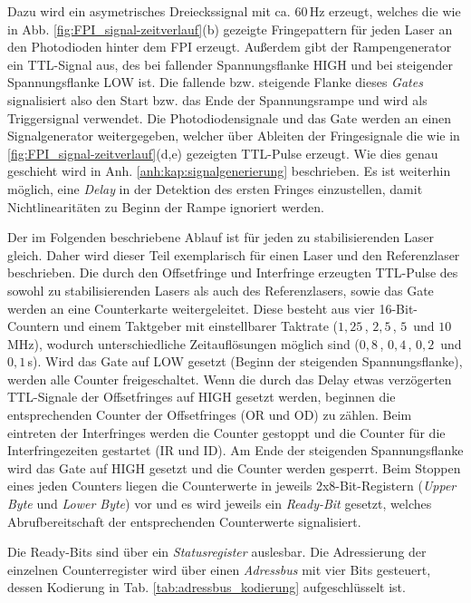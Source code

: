 Dazu wird ein asymetrisches Dreieckssignal mit ca. $60\,$Hz erzeugt, welches die wie in Abb.
\ref{fig:FPI_signal-zeitverlauf}(b) gezeigte Fringepattern für jeden Laser
an den Photodioden hinter dem FPI erzeugt. Außerdem gibt der Rampengenerator
ein TTL-Signal aus, des bei fallender Spannungsflanke HIGH und bei
steigender Spannungsflanke LOW ist. Die fallende bzw. steigende Flanke dieses
\textit{Gates} signalisiert also den Start bzw. das Ende der Spannungsrampe
und wird als Triggersignal verwendet. Die Photodiodensignale und das
Gate werden an einen Signalgenerator weitergegeben, welcher über Ableiten der
Fringesignale die wie in \ref{fig:FPI_signal-zeitverlauf}(d,e) gezeigten TTL-Pulse erzeugt.
Wie dies genau geschieht wird in Anh. \ref{anh:kap:signalgenerierung}
beschrieben. Es ist weiterhin möglich, eine \textit{Delay} in der Detektion des
ersten Fringes einzustellen, damit Nichtlinearitäten zu Beginn der Rampe
ignoriert werden.\par
Der im Folgenden beschriebene Ablauf ist für jeden zu stabilisierenden Laser
gleich. Daher wird dieser Teil exemplarisch für einen Laser und den
Referenzlaser beschrieben. Die durch den Offsetfringe und Interfringe erzeugten
TTL-Pulse des sowohl zu stabilisierenden Lasers als auch des Referenzlasers,
sowie das Gate werden an eine Counterkarte weitergeleitet. Diese besteht aus
vier 16-Bit-Countern und einem Taktgeber mit einstellbarer Taktrate ($1,25\,$,
$2,5\,$, $5\,$ und $10\,$MHz), wodurch unterschiedliche Zeitauflösungen möglich
sind ($0,8\,$, $0,4\,$, $0,2\,$ und $0,1\,$\textmu s).
Wird das Gate auf LOW gesetzt (Beginn der steigenden Spannungsflanke), werden
alle Counter freigeschaltet. Wenn die durch
das Delay etwas verzögerten TTL-Signale der Offsetfringes auf HIGH gesetzt werden, beginnen die
entsprechenden Counter der Offsetfringes (OR und OD) zu zählen. Beim eintreten
der Interfringes werden die Counter gestoppt und die Counter für die
Interfringezeiten gestartet (IR und ID). Am Ende der steigenden Spannungsflanke
wird das Gate auf HIGH gesetzt und die Counter werden gesperrt. Beim Stoppen eines
jeden Counters liegen die Counterwerte in jeweils 2x8-Bit-Registern
(\textit{Upper Byte} und \textit{Lower Byte}) vor und es wird jeweils ein
\textit{Ready-Bit} gesetzt, welches Abrufbereitschaft der entsprechenden
Counterwerte signalisiert.\par
Die Ready-Bits sind über ein \textit{Statusregister} auslesbar. Die Adressierung
der einzelnen Counterregister wird über einen \textit{Adressbus} mit vier Bits
gesteuert, dessen Kodierung in Tab. \ref{tab:adressbus_kodierung} aufgeschlüsselt ist.
